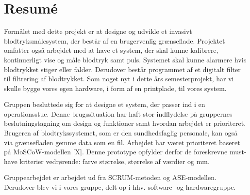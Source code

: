 \chapter*{Resumé}

Formålet med dette projekt er at designe og udvikle et invasivt blodtryksmålesystem, der består af en brugervenlig grænseflade. Projektet omfatter også arbejdet med at have et system, der skal kunne kalibrere, kontinuerligt vise og måle blodtryk samt puls. Systemet skal kunne alarmere hvis blodtrykket stiger eller falder. Derudover består programmet af et digitalt filter til filtrering af blodtrykket. Som noget nyt i dette års semesterprojekt, har vi skulle bygge vores egen hardware, i form af en printplade, til vores system.

Gruppen besluttede sig for at designe et system, der passer ind i en operationsstue. Denne brugssituation har haft stor indflydelse på gruppernes beslutningstagning om design og funktioner samt hvordan arbejdet er prioriteret. Brugeren af blodtrykssystemet, som er den sundhedsfaglig personale, kan også via grænsefladen gemme data som en fil. 
Arbejdet har været prioriteret baseret på MoSCoW-modellen [X]. Denne prototype opfylder derfor de foreskrevne must-have kriterier vedrørende: farve størrelse, størrelse af værdier og mm.

Gruppearbejdet er arbejdet ud fra SCRUM-metoden og ASE-modellen. Derudover blev vi i vores gruppe, delt op i hhv. software- og hardwaregruppe. 



\clearpage